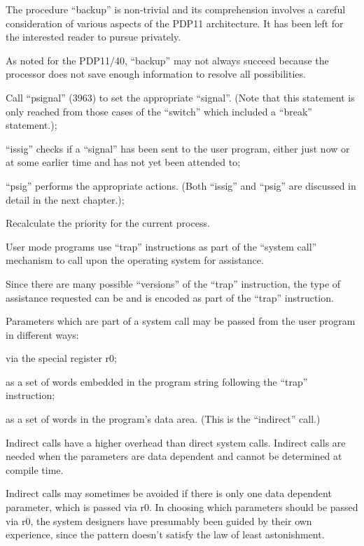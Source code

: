 The procedure ``backup'' is non-trivial
and its comprehension involves a careful consideration of various aspects of
the PDP11 architecture. It has been
left for the interested reader to pursue privately.

As noted for the PDP11/40, ``backup'' may
not always succeed because the processor does not save enough information to
resolve all possibilities.

\bd
\item[218:] Call ``psignal'' (3963) to set the
 appropriate ``signal''. (Note that
 this statement is only reached
 from those cases of the ``switch''
 which included a ``break'' statement.);

\item[2821:] ``issig'' checks if a ``signal'' has
 been sent to the user program,
 either just now or at some earlier time and has not yet been
 attended to;

\item[2822:] ``psig'' performs the appropriate
 actions. (Both ``issig'' and ``psig''
 are discussed in detail in the
 next chapter.);

\item[2823:] Recalculate the priority for the
 current process.
\ed



User mode programs use ``trap'' instructions as part of the ``system call''
mechanism to call upon the operating
system for assistance.

Since there are many possible ``versions'' of the ``trap'' instruction, the
type of assistance requested can be and
is encoded as part of the ``trap''
instruction.


Parameters which are part of a system
call may be passed from the user program in different ways:

\bd
\item[(a)] via the special register r0;

\item[(b)] as a set of words embedded in
 the program string following the
 ``trap'' instruction;

\item[(c)] as a set of words in the
 program's data area. (This is
 the ``indirect'' call.)
\ed


Indirect calls have a higher overhead
than direct system calls. Indirect
calls are needed when the parameters
are data dependent and cannot be determined at compile time.

Indirect calls may sometimes be avoided
if there is only one data dependent
parameter, which is passed via r0. In
choosing which parameters should be
passed via r0, the system designers
have presumably been guided by their
own experience, since the pattern
doesn't satisfy the law of least astonishment.

